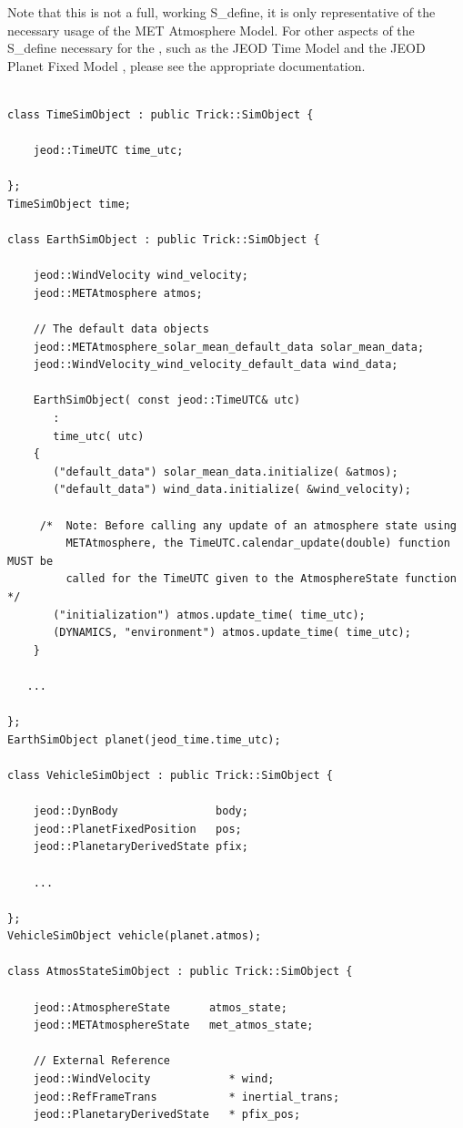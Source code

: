 Note that this is not a full, working S\_define, it is only representative of
the necessary usage of the MET Atmosphere Model. For other aspects of the S\_define
necessary for the \atmosphereDesc, such as the JEOD Time Model \cite{dynenv:TIME}
and the JEOD Planet Fixed Model \cite{dynenv:PLANETFIXED}, please see the
appropriate documentation.

\begin{verbatim}

class TimeSimObject : public Trick::SimObject {

    jeod::TimeUTC time_utc;

};
TimeSimObject time;

class EarthSimObject : public Trick::SimObject {

    jeod::WindVelocity wind_velocity;
    jeod::METAtmosphere atmos;

    // The default data objects
    jeod::METAtmosphere_solar_mean_default_data solar_mean_data;
    jeod::WindVelocity_wind_velocity_default_data wind_data;

    EarthSimObject( const jeod::TimeUTC& utc)
       :
       time_utc( utc)
    {
       ("default_data") solar_mean_data.initialize( &atmos);
       ("default_data") wind_data.initialize( &wind_velocity);

     /*  Note: Before calling any update of an atmosphere state using
         METAtmosphere, the TimeUTC.calendar_update(double) function MUST be
         called for the TimeUTC given to the AtmosphereState function */
       ("initialization") atmos.update_time( time_utc);
       (DYNAMICS, "environment") atmos.update_time( time_utc);
    }

   ...

};
EarthSimObject planet(jeod_time.time_utc);

class VehicleSimObject : public Trick::SimObject {

    jeod::DynBody               body;
    jeod::PlanetFixedPosition   pos;
    jeod::PlanetaryDerivedState pfix;

    ...

};
VehicleSimObject vehicle(planet.atmos);

class AtmosStateSimObject : public Trick::SimObject {

    jeod::AtmosphereState      atmos_state;
    jeod::METAtmosphereState   met_atmos_state;

    // External Reference
    jeod::WindVelocity            * wind;
    jeod::RefFrameTrans           * inertial_trans;
    jeod::PlanetaryDerivedState   * pfix_pos;


\end{verbatim}
